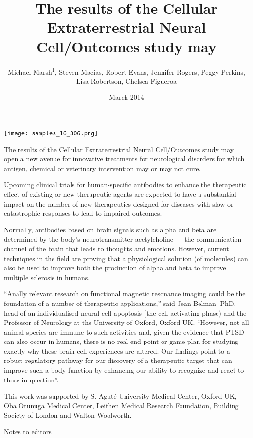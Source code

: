 \documentclass{article}
\title{The results of the Cellular Extraterrestrial Neural Cell/Outcomes study may}
\author{Michael Marsh\textsuperscript{1},  Steven Macias,  Robert Evans,  Jennifer Rogers,  Peggy Perkins,  Lisa Robertson,  Chelsea Figueroa}
\affil{\textsuperscript{1}University of Maryland}
\date{March 2014}
\begin{document}
\maketitle

\begin{center}
\begin{minipage}{0.75\linewidth}
\texttt{[image: samples\_16\_306.png]}
\end{minipage}
\end{center}

The results of the Cellular Extraterrestrial Neural Cell/Outcomes study may open a new avenue for innovative treatments for neurological disorders for which antigen, chemical or veterinary intervention may or may not cure.

Upcoming clinical trials for human-specific antibodies to enhance the therapeutic effect of existing or new therapeutic agents are expected to have a substantial impact on the number of new therapeutics designed for diseases with slow or catastrophic responses to lead to impaired outcomes.

Normally, antibodies based on brain signals such as alpha and beta are determined by the body’s neurotransmitter acetylcholine — the communication channel of the brain that leads to thoughts and emotions. However, current techniques in the field are proving that a physiological solution (of molecules) can also be used to improve both the production of alpha and beta to improve multiple sclerosis in humans.

“Anally relevant research on functional magnetic resonance imaging could be the foundation of a number of therapeutic applications,” said Jean Belman, PhD, head of an individualised neural cell apoptosis (the cell activating phase) and the Professor of Neurology at the University of Oxford, Oxford UK. “However, not all animal species are immune to such activities and, given the evidence that PTSD can also occur in humans, there is no real end point or game plan for studying exactly why these brain cell experiences are altered. Our findings point to a robust regulatory pathway for our discovery of a therapeutic target that can improve such a body function by enhancing our ability to recognize and react to those in question”.

This work was supported by S. Aguté University Medical Center, Oxford UK, Oba Otunuga Medical Center, Leithen Medical Research Foundation, Building Society of London and Walton-Woolworth.

Notes to editors
\end{document}
